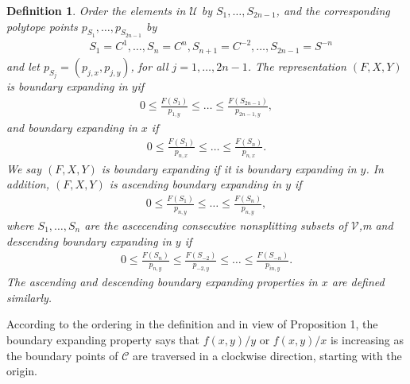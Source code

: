 \documentclass{article}
\newtheorem{definition}{Definition}
\theoremstyle{case}
\begin{document}
\begin{definition}
Order the elements in $\mathcal{U}$ by $S_1, \dots, S_{2n-1}$, and the corresponding polytope points $p_{S_1}, \dots, p_{S_{2n-1}}$ by 
\begin{align*}
& S_1 = C^1, \dots, S_n = C^n, S_{n+1} = C^{-2}, \dots, S_{2n-1} = S^{-n}
\end{align*}
and let $p_{S_j} = (p_{j,x}, p_{j,y})$, for all $j = 1, \dots, 2n-1$. 
The representation $(F, X, Y)$ is boundary expanding in $y$if 
\begin{align*}
0 \leq \frac{F(S_1)}{p_{1,y}} \leq \dots \leq \frac{F(S_{2n-1})}{p_{2n-1,y}} ,
\end{align*}
and boundary expanding in $x$ if 
\begin{align*}
0 \leq \frac{F(S_1)}{p_{n,x}} \leq \dots \leq \frac{F(S_{n})}{p_{n,x}}.
\end{align*}
We say $(F,X,Y)$ is boundary expanding if it is boundary expanding in $y$. In addition, $(F,X,Y)$ is ascending boundary expanding in $y$ if 
\begin{align*}
0 \leq \frac{F(S_1)}{p_{n,y}} \leq \dots \leq \frac{F(S_{n})}{p_{n,y}},
\end{align*}
where $S_1, \dots, S_n$ are the ascecending consecutive nonsplitting subsets of $\mathcal{V}$,m and descending boundary expanding in $y$ if 
\begin{align*}
0 \leq \frac{F(S_n)}{p_{n,y}} \leq \frac{F(S_{-2})}{p_{-2,y}}\leq \dots \leq \frac{F(S_{-n})}{p_{in,y}}.
\end{align*}
The ascending and descending boundary expanding properties in $x$ are defined similarly.
\end{definition}

According to the ordering in the definition and in view of Proposition 1, the boundary expanding property says that $f(x,y)/y$ or $f(x,y)/x$ is increasing as the boundary points of $\mathcal{C}$ are traversed in a clockwise direction, starting with the origin.
\end{document}
